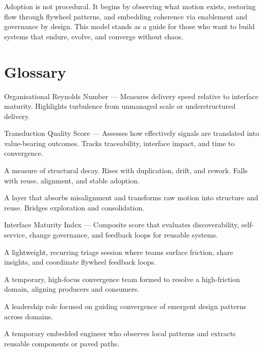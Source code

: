\documentclass[12pt]{article}
\begin{document}
Adoption is not procedural. It begins by observing what motion exists, restoring flow through flywheel patterns, and embedding coherence via enablement and governance by design. This model stands as a guide for those who want to build systems that endure, evolve, and converge without chaos.

\newpage
\section*{Glossary}


\begin{description}[style=nextline]
  \item[Org Re] Organisational Reynolds Number --- Measures delivery speed relative to interface maturity. Highlights turbulence from unmanaged scale or understructured delivery.
  
  \item[TQS] Transduction Quality Score --- Assesses how effectively signals are translated into value-bearing outcomes. Tracks traceability, interface impact, and time to convergence.
  
  \item[Entropic Pressure] A measure of structural decay. Rises with duplication, drift, and rework. Falls with reuse, alignment, and stable adoption.
  
  \item[Flywheel] A layer that absorbs misalignment and transforms raw motion into structure and reuse. Bridges exploration and consolidation.
  
  \item[IMI] Interface Maturity Index --- Composite score that evaluates discoverability, self-service, change governance, and feedback loops for reusable systems.
  
  \item[Signal Clinic] A lightweight, recurring triage session where teams surface friction, share insights, and coordinate flywheel feedback loops.
  
  \item[Flow Cell] A temporary, high-focus convergence team formed to resolve a high-friction domain, aligning producers and consumers.
  
  \item[Pattern Shepherd] A leadership role focused on guiding convergence of emergent design patterns across domains.
  
  \item[Shadow Integrator] A temporary embedded engineer who observes local patterns and extracts reusable components or paved paths.
\end{description}
\end{document}
